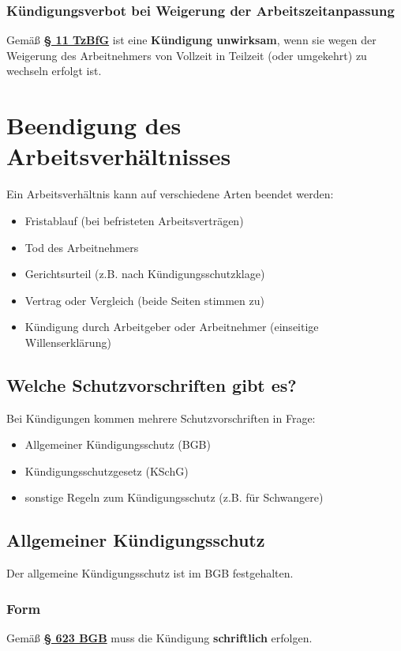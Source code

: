 \documentclass[12pt,A4]{extarticle}
\newcommand{\bgb}[2][]{\textbf{\textcolor{gesetzLink}{\href{https://www.gesetze-im-internet.de/bgb/__#2.html}{§ #2 \ifthenelse{\equal{#1}{}}{}{#1 }BGB}}}}
\newcommand{\tzbfG}[2][]{\textbf{\textcolor{gesetzLink}{\href{https://www.gesetze-im-internet.de/tzbfg/__#2.html}{§ #2 \ifthenelse{\equal{#1}{}}{}{#1 }TzBfG}}}}
\begin{document}
\subsubsection{Kündigungsverbot bei Weigerung der Arbeitszeitanpassung}
Gemäß \tzbfG{11} ist eine \textbf{Kündigung unwirksam}, wenn sie wegen der Weigerung des Arbeitnehmers von Vollzeit in Teilzeit (oder umgekehrt) zu wechseln erfolgt ist.

\section{Beendigung des Arbeitsverhältnisses}
Ein Arbeitsverhältnis kann auf verschiedene Arten beendet werden:
\begin{itemize}
  \item{Fristablauf (bei befristeten Arbeitsverträgen)}
  \item{Tod des Arbeitnehmers}
  \item{Gerichtsurteil (z.B. nach Kündigungsschutzklage)}
  \item{Vertrag oder Vergleich (beide Seiten stimmen zu)}
  \item{Kündigung durch Arbeitgeber oder Arbeitnehmer (einseitige Willenserklärung)}
\end{itemize}

\subsection{Welche Schutzvorschriften gibt es?}
Bei Kündigungen kommen mehrere Schutzvorschriften in Frage:
\begin{itemize}
  \item{Allgemeiner Kündigungsschutz (BGB)}
  \item{Kündigungsschutzgesetz (KSchG)}
  \item{sonstige Regeln zum Kündigungsschutz (z.B. für Schwangere)}
\end{itemize}

\subsection{Allgemeiner Kündigungsschutz}
Der allgemeine Kündigungsschutz ist im BGB festgehalten.

\subsubsection{Form}
Gemäß \bgb{623} muss die Kündigung \textbf{schriftlich} erfolgen.
\end{document}
